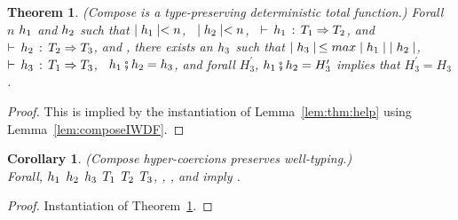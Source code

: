\documentclass[acmtog, authorversion, acmlarge]{acmart}
\newtheorem{thm}{Theorem}
\newtheorem{cor}{Corollary}
\begin{document}
\begin{thm}
  \label{thm:composeWDF}
  (Compose is a type-preserving deterministic total function.)  Forall
  $n$ $h_1$ and $h_2$ such that $\mid h_1 \mid < n$, \,
  $\mid h_2 \mid < n$, \, $\vdash \, h_1 \, : \, T_1 \Rightarrow T_2$, and
  $\vdash \, h_2 \, : \, T_2 \Rightarrow T_3$, and , there exists an $h_3$ such that
  $\mid h_3 \mid \, \le max \mid h_1 \mid \; \mid h_2 \mid$, \,
  $\vdash \, h_3 \, : \, T_1 \Rightarrow T_3$, \, $h_1 \fatsemi h_2 = h_3$, and
  forall $H_{3}^{\prime}$, \; $h_1 \fatsemi h_2 = H_{3}^{\prime}$
  implies that $H_{3}^{\prime} = H_{3}$.
\end{thm}
\begin{proof}
  This is implied by the instantiation of Lemma~\ref{lem:thm:help}
  using Lemma~\ref{lem:composeIWDF}.
\end{proof}

\begin{cor}
  (Compose hyper-coercions preserves well-typing.)\\
  Forall, $h_1$ $h_2$ $h_3$ $T_1$ $T_2$ $T_3$, \;
  , \; , and
   \; imply .
\end{cor}
\begin{proof}
  Instantiation of Theorem~\ref{thm:composeWDF}.
\end{proof}

\clearpage
\end{document}
